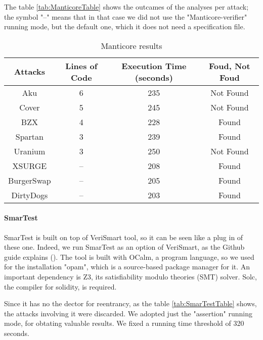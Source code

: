 The table \autoref*{tab:ManticoreTable} shows the outcames of the analyses per attack; the symbol "--" means that in that case we did not use the 
"Manticore-verifier" running mode, but the default one, which it does not need a specification file.

\begin{center}
\begin{table*}
    \caption{Manticore results}
        \label{tab:ManticoreTable}
        \begin{tabular}{cccc}
        \toprule
            Attacks & Lines of Code & Execution Time (seconds) & Foud, Not Foud\\
            \midrule
            Aku & 6 & 235  & Not Found \\ 
            Cover & 5 & 245 & Not Found \\ 
            BZX  & 4 & 228 & Found \\ 
            Spartan & 3 & 239 & Found \\ 
            Uranium  & 3 & 250 & Not Found \\ 
            XSURGE & -- & 208 & Found \\ 
            BurgerSwap  &  -- & 205 & Found\\ 
            DirtyDogs & -- & 203 & Found \\
        \bottomrule
    \end{tabular}
\end{table*}
\end{center}

\paragraph{SmarTest} SmarTest is built on top of VeriSmart tool, so it can be seen like a plug in of these one. Indeed, we run SmarTest as an option of VeriSmart, 
as the Github guide explains (\cite{SmarTestGitHub}). The tool is built with OCalm, a program language, so we used for the installation "opam", which is a source-based package manager for it.
An important dependency is Z3, its satisfiability modulo theories (SMT) solver. Solc, the compiler for solidity, is required.

Since it has no the dector for reentrancy, as the table \autoref{tab:SmarTestTable} shows, the attacks involving it were discarded. We adopted just the "assertion" running mode, for obtating valuable results. 
We fixed a running time threshold of 320 seconds.

